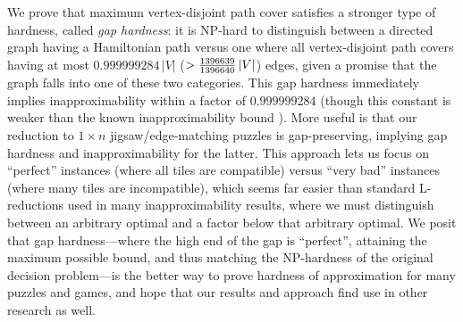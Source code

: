 \documentclass[11pt]{article}
\begin{document}
We prove that maximum vertex-disjoint path cover satisfies a stronger type
of hardness, called \emph{gap hardness}: it is NP-hard to distinguish between a
directed graph having a Hamiltonian path versus one where all vertex-disjoint
path covers having at most $ 0.999999284 \, |V|$
($> {1396639 \over 1396640} \, |V|$)
edges, given a promise that the graph falls into one of these two categories.
This gap hardness immediately implies inapproximability within a factor of
$0.999999284$ (though this constant is weaker than the known
inapproximability bound \cite{Enge03}).
More useful is that our reduction to $1 \times n$ jigsaw/edge-matching puzzles
is gap-preserving, implying gap hardness and inapproximability for the latter.
This approach lets us focus on ``perfect'' instances (where all tiles are
compatible) versus ``very bad'' instances (where many tiles are incompatible),
which seems far easier than standard L-reductions used in many
inapproximability results, where we must distinguish between an arbitrary
optimal and a factor below that arbitrary optimal.
We posit that gap hardness---where the high end of the gap is ``perfect'',
attaining the maximum possible bound, and thus matching the NP-hardness of the
original decision problem---is the better way to prove hardness of approximation
for many puzzles and games,
and hope that our results and approach find use in other research as well.


\end{document}
